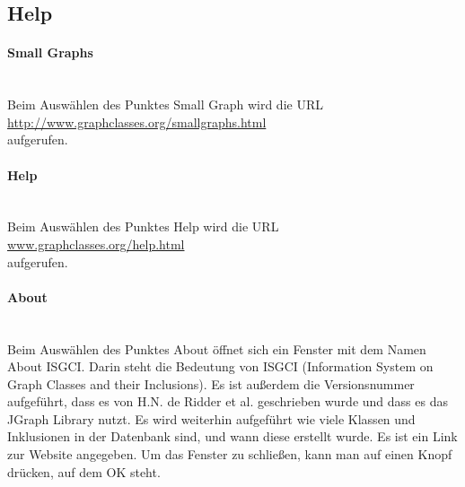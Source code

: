 \documentclass[10pt,a4paper]{article}
\begin{document}
\subsection{Help}
\paragraph{Small Graphs}\ \\
Beim Auswählen des Punktes Small Graph wird die URL\\ \href{http://www.graphclasses.org/smallgraphs.html}{http://www.graphclasses.org/smallgraphs.html} \\
aufgerufen.\\
\paragraph{Help}\ \\
Beim Auswählen des Punktes Help wird die URL\\ \href{www.graphclasses.org/help.html}{www.graphclasses.org/help.html}\\ aufgerufen.\\
\paragraph{About}\ \\
Beim Auswählen des Punktes About öffnet sich ein Fenster mit dem Namen About ISGCI. Darin steht die Bedeutung von ISGCI (Information System on Graph Classes and their Inclusions). Es ist außerdem die Versionsnummer aufgeführt, dass es von H.N. de Ridder et al. geschrieben wurde und dass es das JGraph Library nutzt. Es wird weiterhin aufgeführt wie viele Klassen und Inklusionen in der Datenbank sind, und wann diese erstellt wurde. Es ist ein Link zur Website angegeben. Um das Fenster zu schließen, kann man auf einen Knopf drücken, auf dem OK steht.\\
\end{document}
